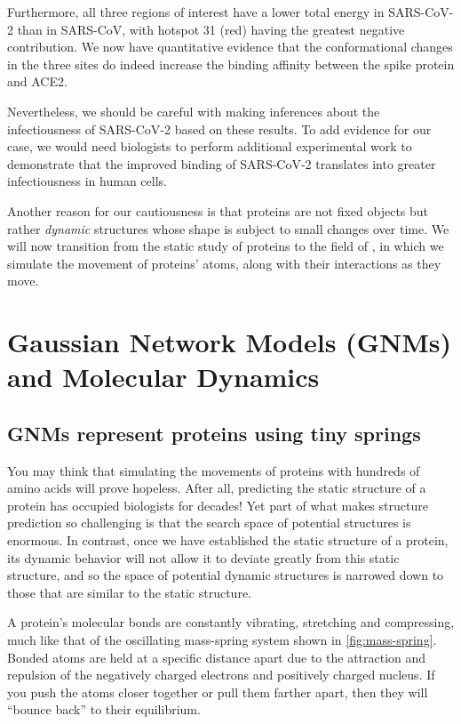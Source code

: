Furthermore, all three regions of interest have a lower total energy in SARS-CoV-2 than in SARS-CoV, with hotspot 31 (red) having the greatest negative contribution. We now have quantitative evidence that the conformational changes in the three sites do indeed increase the binding affinity between the spike protein and ACE2.

Nevertheless, we should be careful with making inferences about the infectiousness of SARS-CoV-2 based on these results. To add evidence for our case, we would need biologists to perform additional experimental work to demonstrate that the improved binding of SARS-CoV-2 translates into greater infectiousness in human cells.

Another reason for our cautiousness is that proteins are not fixed objects but rather \textit{dynamic} structures whose shape is subject to small changes over time. We will now transition from the static study of proteins to the field of , in which we simulate the movement of proteins' atoms, along with their interactions as they move.\\

\FloatBarrier
{}

\section{Gaussian Network Models (GNMs) and Molecular Dynamics}
\label{sec:gaussian_network_models}
\subsection{GNMs represent proteins using tiny springs}

You may think that simulating the movements of proteins with hundreds of amino acids will prove hopeless. After all, predicting the static structure of a protein has occupied biologists for decades! Yet part of what makes structure prediction so challenging is that the search space of potential structures is enormous. In contrast, once we have established the static structure of a protein, its dynamic behavior will not allow it to deviate greatly from this static structure, and so the space of potential dynamic structures is narrowed down to those that are similar to the static structure.

A protein's molecular bonds are constantly vibrating, stretching and compressing, much like that of the oscillating mass-spring system shown in \autoref{fig:mass-spring}. Bonded atoms are held at a specific distance apart due to the attraction and repulsion of the negatively charged electrons and positively charged nucleus. If you push the atoms closer together or pull them farther apart, then they will ``bounce back'' to their equilibrium.\\


